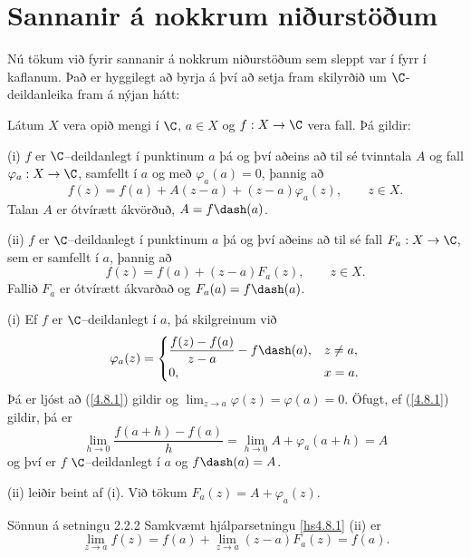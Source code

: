 \section{Sannanir á nokkrum niðurstöðum}



\noindent
Nú tökum við fyrir sannanir á nokkrum niðurstöðum sem sleppt var í
fyrr í kaflanum.  Það er hyggilegt að byrja á því að setja fram skilyrðið um
$\C$-deildanleika fram á nýjan hátt:



\begin{hs}\label{hs4.8.1}  Látum $X$ vera opið mengi 
í $\C$, $a\in X$ og $f:X\to \C$ vera fall.  Þá
gildir:

\smallskip
(i) $f$ er $\C$--deildanlegt í punktinum $a$ þá og því aðeins
að til sé tvinntala $A$ og fall $\varphi_a:X\to \C$,  samfellt í
$a$ og með $\varphi_a(a)=0$,  þannig að
 \begin{equation}f(z)=f(a)+A(z-a)+(z-a)\varphi_a(z), \qquad z\in X.
\label{4.8.1}
 \end{equation}
Talan $A$ er ótvírætt ákvörðuð, $A=f\dash(a)$.

\smallskip
(ii) $f$ er $\C$--deildanlegt í punktinum $a$ þá og því aðeins
að til sé fall $F_a:X\to \C$, sem er samfellt í $a$, þannig að
 \begin{equation*}f(z)=f(a)+(z-a)F_a(z), \qquad z\in X.
\label{4.8.2}
 \end{equation*}
Fallið $F_a$ er ótvírætt ákvarðað og  $F_a(a)=f\dash(a)$.
\end{hs}

\begin{so} (i) Ef $f$ er $\C$--deildanlegt í $a$, þá skilgreinum við 
$$
\varphi_a(z)=\begin{cases}
\dfrac{f(z)-f(a)}{z-a}-f\dash(a),& z\neq a,\\ 
0,& x=a.\end{cases}
$$
Þá er ljóst að (\ref{4.8.1}) gildir og $\lim_{z\to a}\varphi(z)=\varphi(a)=0$. 
Öfugt, ef (\ref{4.8.1}) gildir, þá er 
$$
\lim\limits_{h\to 0} \dfrac{f(a+h)-f(a)}h=
\lim\limits_{h\to 0}A+\varphi_a(a+h)=A
$$
og því er $f$ $\C$--deildanlegt í $a$ og $f\dash(a)=A$.

\smallskip
(ii) leiðir beint af (i).  Við tökum  $F_a(z)=A+\varphi_a(z)$.
\end{so}

\begin{sotx}{Sönnun á setningu 2.2.2}  Samkvæmt hjálparsetningu
\ref{hs4.8.1} (ii) er
$$\lim_{z\to a} f(z)=f(a)+\lim_{z\to a} (z-a)F_a(z)=f(a).
$$
\end{sotx}



